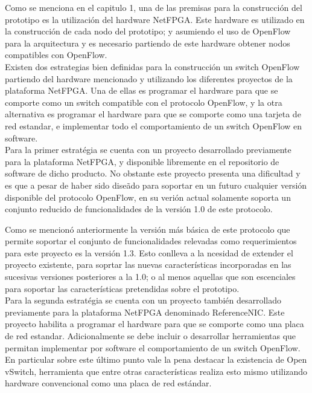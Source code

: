 Como se menciona en el capitulo 1, una de las premisas para la construcción del prototipo es la utilizaci\'on del hardware NetFPGA. Este hardware es utilizado en la construcción de cada nodo del prototipo; y asumiendo el uso de OpenFlow para la arquitectura y es necesario partiendo de este hardware obtener nodos compatibles con OpenFlow.\\ 

Existen dos estrategias bien definidas para la construcci\'on un switch OpenFlow partiendo del hardware mencionado y utilizando los diferentes proyectos de la plataforma NetFPGA. Una de ellas es programar el hardware para que se comporte como un switch compatible con el protocolo OpenFlow, y la otra alternativa es programar el hardware para que se comporte como una tarjeta de red estandar, e implementar todo el comportamiento de un switch OpenFlow en software.\\

Para la primer estrat\'egia se cuenta con un proyecto desarrollado previamente para la plataforma NetFPGA, y disponible libremente en el repositorio de software de dicho producto. No obstante este proyecto presenta una dificultad y es que a pesar de haber sido dise\~ado para soportar en un futuro cualquier versi\'on disponible del protocolo OpenFlow, en su veri\'on actual solamente soporta un conjunto reducido de funcionalidades de la versi\'on 1.0 de este protocolo. 

Como se mencion\'o anteriormente la versi\'on m\'as b\'asica de este protocolo que permite soportar el conjunto de funcionalidades relevadas como requerimientos para este proyecto es la versi\'on 1.3. Esto conlleva a la ncesidad de extender el proyecto existente, para soprtar las nuevas caracter\'isticas incorporadas en las sucesivas versiones posteriores a la 1.0; o al menos aquellas que son escenciales para soportar las caracter\'isticas pretendidas sobre el prototipo.\\

Para la segunda estrat\'egia se cuenta con un proyecto tambi\'en desarrollado previamente para la plataforma NetFPGA denominado ReferenceNIC. Este proyecto habilita a programar el hardware para que se comporte como una placa de red estandar. Adicionalmente se debe incluir o desarrollar herramientas que permitan implementar por software el comportamiento de un switch OpenFlow. En particular sobre este \'ultimo punto vale la pena destacar la existencia de Open vSwitch, herramienta que entre otras caracter\'isticas realiza esto mismo utilizando hardware convencional como una placa de red estándar.\\


